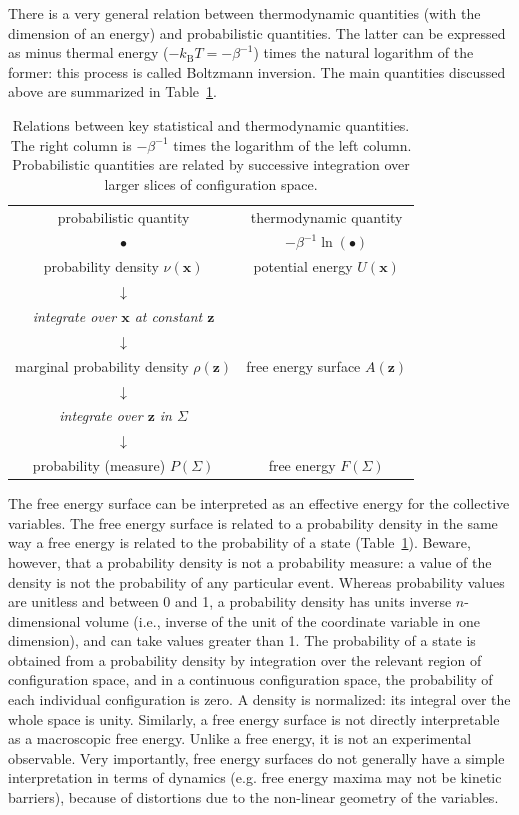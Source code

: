 \documentclass[9pt,review]{livecoms}
\newcommand{\vx}{\mathbf{x}}
\newcommand{\vz}{\mathbf{z}}
\begin{document}
There is a very general relation between thermodynamic quantities (with the dimension of an energy) and probabilistic quantities.
The latter can be expressed as minus thermal energy ($-k_\mathrm{B} T = -\beta^{-1}$) times the natural logarithm of the former: this process is called Boltzmann inversion.
The main quantities discussed above are summarized in Table~\ref{tab:quantities}.


\begin{table}[]
\small
    \centering
\begin{tabular}{c|c}
probabilistic quantity & thermodynamic quantity  \\
$\bullet$ &   $-\beta^{-1} \ln(\bullet)$ \\
\hline
probability density $\nu(\vx)$  & potential energy  $U(\vx)$\\
$\downarrow$ &  \\
\textit{integrate over $\vx$ at constant $\vz$} & \\
$\downarrow$ &  \\
marginal probability density $\rho(\vz)$ & free energy surface $A(\vz)$ \\
$\downarrow$ &  \\
\textit{integrate over $\vz$ in $\Sigma$} & \\
$\downarrow$ &  \\
probability (measure) $P(\Sigma)$  & free energy  $F(\Sigma)$\\
\end{tabular}
    \caption{Relations between key statistical and thermodynamic quantities.
    The right column is $-\beta^{-1}$ times the logarithm of the left column.
    Probabilistic quantities are related by successive integration over larger slices of configuration space.}
    \label{tab:quantities}
\end{table}


The free energy surface can be interpreted as an effective energy for the collective variables.
The free energy surface is related to a probability density in the same way a free energy is related to the probability of a state (Table~\ref{tab:quantities}).
Beware, however, that a probability density is not a probability measure: a value of the density is not the probability of any particular event.
Whereas probability values are unitless and between 0 and 1, a probability density has units inverse $n$-dimensional volume (i.e., inverse of the unit of the coordinate variable in one dimension), and can take values greater than 1. The probability of a state is obtained from a probability density by integration over the relevant region of configuration space, and in a continuous configuration space, the probability of each individual configuration is zero.
A density is normalized: its integral over the whole space is unity.
Similarly, a free energy surface is not directly interpretable as a macroscopic free energy. Unlike a free energy, it is not an experimental observable.
Very importantly, free energy surfaces do not generally have a simple interpretation in terms of dynamics (e.g. free energy maxima may not be kinetic barriers), because of distortions due to the non-linear geometry of the variables.
\end{document}

